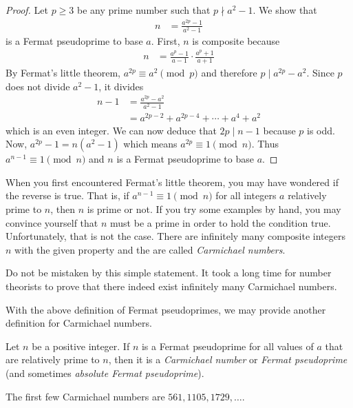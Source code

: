	\begin{proof}
		Let $p\geq 3$ be any prime number such that $p \nmid a^2-1$. We show that
			\begin{align*}
				n
					& = \frac{a^{2p}-1}{a^2-1}
			\end{align*}
		is a Fermat pseudoprime to base $a$. First, $n$ is composite because
			\begin{align*}
				n
					& = \frac{a^p-1}{a-1}\cdot \frac{a^p+1}{a+1}
			\end{align*}
		By Fermat's little theorem, $a^{2p} \equiv a^2 \pmod p$ and therefore $p\mid a^{2p}-a^2$. Since $p$ does not divide $a^2-1$, it divides
			\begin{align*}
				n-1
					& = \frac{a^{2p}-a^2}{a^2-1}\\
					& = a^{2p-2}+a^{2p-4}+\cdots+a^4+a^2
			\end{align*}
		which is an even integer. We can now deduce that $2p \mid n-1$ because $p$ is odd. Now, $a^{2p}-1 = n\left(a^2-1\right)$ which means $a^{2p} \equiv 1 \pmod n$. Thus $a^{n-1}\equiv 1 \pmod n$ and $n$ is a Fermat pseudoprime to base $a$.
	\end{proof}
When you first encountered Fermat's little theorem, you may have wondered if the reverse is true. That is, if $a^{n-1}\equiv 1\pmod n$ for all integers $a$ relatively prime to $n$, then $n$ is prime or not. If you try some examples by hand, you may convince yourself that $n$ must be a prime in order to hold the condition true. Unfortunately, that is not the case. There are infinitely many composite integers $n$ with the given property and the are called \textit{Carmichael numbers}.
\begin{note}
	Do not be mistaken by this simple statement. It took a long time for number theorists to prove that there indeed exist infinitely many Carmichael numbers.
\end{note}
With the above definition of Fermat pseudoprimes, we may provide another definition for Carmichael numbers.

	\begin{definition}
		Let $n$ be a positive integer. If $n$ is a Fermat pseudoprime for all values of $a$ that are relatively prime to $n$, then it is a \textit{Carmichael number} or \textit{Fermat pseudoprime} (and sometimes \textit{absolute Fermat pseudoprime}).
	\end{definition}

The first few Carmichael numbers are $561, 1105, 1729, \dots$.

